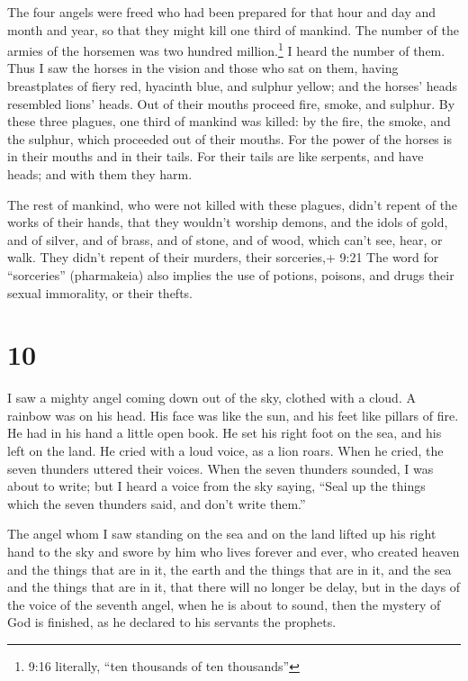  The four angels were freed who had been prepared for that
hour and day and month and year, so that they might kill one third of
mankind.  The number of the armies of the horsemen was two
hundred million.\footnote{9:16 literally, ``ten thousands of ten
  thousands''} I heard the number of them.  Thus I saw the
horses in the vision and those who sat on them, having breastplates of
fiery red, hyacinth blue, and sulphur yellow; and the horses' heads
resembled lions' heads. Out of their mouths proceed fire, smoke, and
sulphur.  By these three plagues, one third of mankind was
killed: by the fire, the smoke, and the sulphur, which proceeded out of
their mouths.  For the power of the horses is in their
mouths and in their tails. For their tails are like serpents, and have
heads; and with them they harm.

 The rest of mankind, who were not killed with these
plagues, didn't repent of the works of their hands, that they wouldn't
worship demons, and the idols of gold, and of silver, and of brass, and
of stone, and of wood, which can't see, hear, or walk. 
They didn't repent of their murders, their sorceries,+ 9:21 The word for
``sorceries'' (pharmakeia) also implies the use of potions, poisons, and
drugs their sexual immorality, or their thefts.

\hypertarget{section-9}{%
\section{10}\label{section-9}}

 I saw a mighty angel coming down out of the sky, clothed
with a cloud. A rainbow was on his head. His face was like the sun, and
his feet like pillars of fire.  He had in his hand a little
open book. He set his right foot on the sea, and his left on the land.
 He cried with a loud voice, as a lion roars. When he cried,
the seven thunders uttered their voices.  When the seven
thunders sounded, I was about to write; but I heard a voice from the sky
saying, ``Seal up the things which the seven thunders said, and don't
write them.''

 The angel whom I saw standing on the sea and on the land
lifted up his right hand to the sky  and swore by him who
lives forever and ever, who created heaven and the things that are in
it, the earth and the things that are in it, and the sea and the things
that are in it, that there will no longer be delay,  but in
the days of the voice of the seventh angel, when he is about to sound,
then the mystery of God is finished, as he declared to his servants the
prophets.

